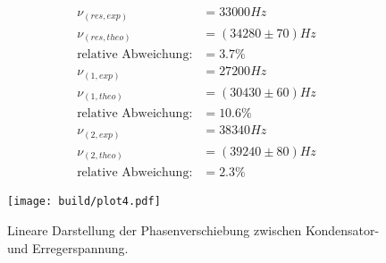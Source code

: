 \begin{align*}
  \nu_(res, exp) &= 33 000 Hz \\
  \nu_(res, theo) &= (34 280 \pm 70) Hz \\
  \text{relative Abweichung:} &= 3.7 \% \\
  \nu_(1, exp) &= 27 200 Hz \\
  \nu_(1, theo) &=(30 430 \pm 60) Hz \\
  \text{relative Abweichung:} &= 10.6 \% \\
  \nu_(2, exp) &= 38 340 Hz \\
  \nu_(2, theo) &= (39 240 \pm 80) Hz \\
  \text{relative Abweichung:} &= 2.3 \%
\end{align*}

\begin{figure}
  \centering
  \texttt{[image: build/plot4.pdf]}
  \caption{Lineare Darstellung der Phasenverschiebung zwischen Kondensator- und Erregerspannung.}
  \label{fig:plot4}
\end{figure}
